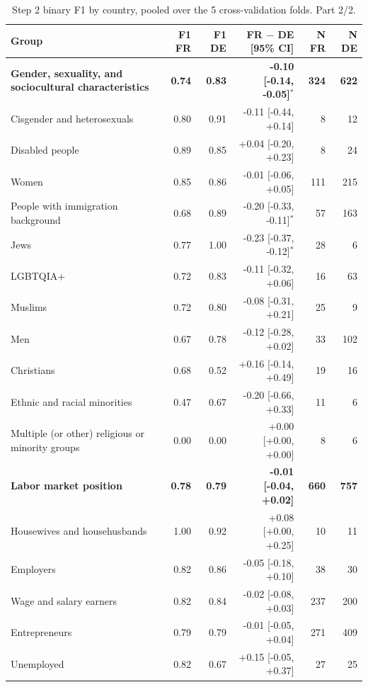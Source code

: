 \begin{table}[htbp]
\centering
\scriptsize
\begin{threeparttable}
\caption{Step 2 binary F1 by country, pooled over the 5 cross-validation folds. Part 2/2.}
\label{tab:step2-country-part2}
\begin{tabular}{l rr r rr}
\toprule
Group & F1 FR & F1 DE & FR $-$ DE [95\% CI] & N FR & N DE \\
\midrule
\textbf{Gender, sexuality, and sociocultural characteristics} & \textbf{0.74} & \textbf{0.83} & \textbf{-0.10 [-0.14, -0.05]$^{*}$} & \textbf{324} & \textbf{622} \\
\quad Cisgender and heterosexuals & 0.80 & 0.91 & -0.11 [-0.44, +0.14] & 8 & 12 \\
\quad Disabled people & 0.89 & 0.85 & +0.04 [-0.20, +0.23] & 8 & 24 \\
\quad Women & 0.85 & 0.86 & -0.01 [-0.06, +0.05] & 111 & 215 \\
\quad People with immigration background & 0.68 & 0.89 & -0.20 [-0.33, -0.11]$^{*}$ & 57 & 163 \\
\quad Jews & 0.77 & 1.00 & -0.23 [-0.37, -0.12]$^{*}$ & 28 & 6 \\
\quad LGBTQIA+ & 0.72 & 0.83 & -0.11 [-0.32, +0.06] & 16 & 63 \\
\quad Muslims & 0.72 & 0.80 & -0.08 [-0.31, +0.21] & 25 & 9 \\
\quad Men & 0.67 & 0.78 & -0.12 [-0.28, +0.02] & 33 & 102 \\
\quad Christians & 0.68 & 0.52 & +0.16 [-0.14, +0.49] & 19 & 16 \\
\quad Ethnic and racial minorities & 0.47 & 0.67 & -0.20 [-0.66, +0.33] & 11 & 6 \\
\quad Multiple (or other) religious or minority groups & 0.00 & 0.00 & +0.00 [+0.00, +0.00] & 8 & 6 \\
\addlinespace
\textbf{Labor market position} & \textbf{0.78} & \textbf{0.79} & \textbf{-0.01 [-0.04, +0.02]} & \textbf{660} & \textbf{757} \\
\quad Housewives and househusbands & 1.00 & 0.92 & +0.08 [+0.00, +0.25] & 10 & 11 \\
\quad Employers & 0.82 & 0.86 & -0.05 [-0.18, +0.10] & 38 & 30 \\
\quad Wage and salary earners & 0.82 & 0.84 & -0.02 [-0.08, +0.03] & 237 & 200 \\
\quad Entrepreneurs & 0.79 & 0.79 & -0.01 [-0.05, +0.04] & 271 & 409 \\
\quad Unemployed & 0.82 & 0.67 & +0.15 [-0.05, +0.37] & 27 & 25 \\

\end{tabular}
\end{threeparttable}
\end{table}
